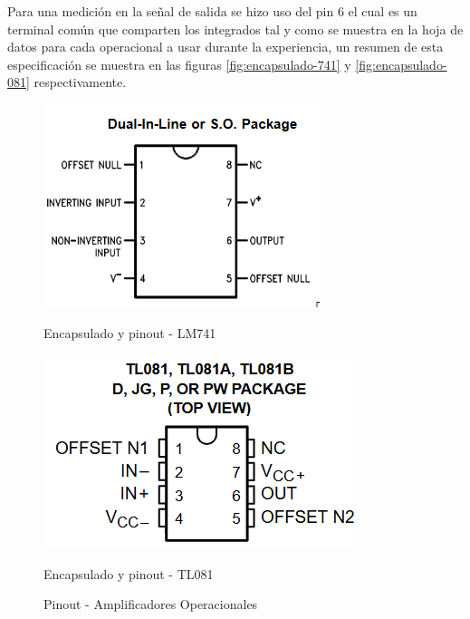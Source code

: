 \documentclass[conference]{IEEEtran}
\begin{document}
	Para una medición en la señal de salida se hizo uso del pin 6 el cual es un terminal común que comparten los integrados tal y como se muestra en la hoja de datos para cada operacional a usar durante la experiencia, un resumen de esta especificación se muestra en las figuras \ref{fig:encapsulado-741} y \ref{fig:encapsulado-081} respectivamente.
	
	
	\begin{figure}[h]
		\centering
		\begin{minipage}{0.4\linewidth}
			\centering	
			\includegraphics[width=\linewidth]{media/encapsulado-741}
			\caption{Encapsulado y pinout - LM741}
			\label{fig:encapsulado-741}	
		\end{minipage}
		\hfill
		\begin{minipage}{0.4\linewidth}
			\centering
			\includegraphics[width=\linewidth]{media/encapsulado-081}
			\caption{Encapsulado y pinout - TL081}
			\label{fig:encapsulado-081}
		\end{minipage}
		\caption{Pinout - Amplificadores Operacionales}
		\label{fig:integrados-opam}
	\end{figure}
	
\end{document}
